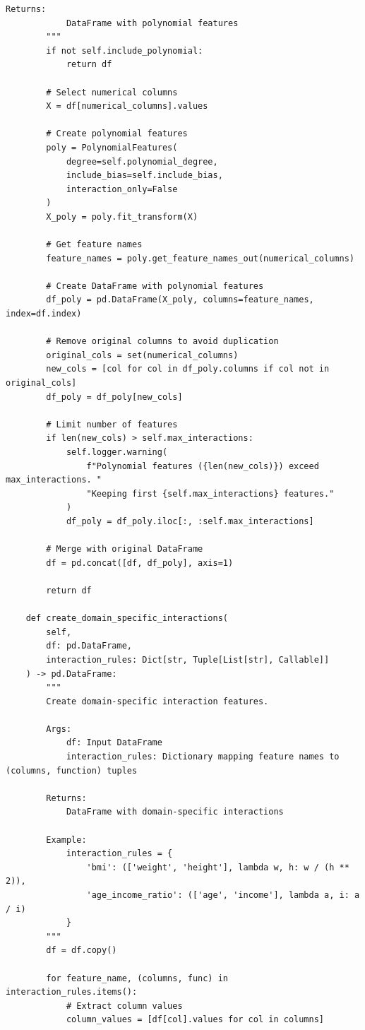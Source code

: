 \begin{lstlisting}[style=python, caption={Intelligent Feature Interaction Generation}]
        Returns:
            DataFrame with polynomial features
        """
        if not self.include_polynomial:
            return df

        # Select numerical columns
        X = df[numerical_columns].values

        # Create polynomial features
        poly = PolynomialFeatures(
            degree=self.polynomial_degree,
            include_bias=self.include_bias,
            interaction_only=False
        )
        X_poly = poly.fit_transform(X)

        # Get feature names
        feature_names = poly.get_feature_names_out(numerical_columns)

        # Create DataFrame with polynomial features
        df_poly = pd.DataFrame(X_poly, columns=feature_names, index=df.index)

        # Remove original columns to avoid duplication
        original_cols = set(numerical_columns)
        new_cols = [col for col in df_poly.columns if col not in original_cols]
        df_poly = df_poly[new_cols]

        # Limit number of features
        if len(new_cols) > self.max_interactions:
            self.logger.warning(
                f"Polynomial features ({len(new_cols)}) exceed max_interactions. "
                "Keeping first {self.max_interactions} features."
            )
            df_poly = df_poly.iloc[:, :self.max_interactions]

        # Merge with original DataFrame
        df = pd.concat([df, df_poly], axis=1)

        return df

    def create_domain_specific_interactions(
        self,
        df: pd.DataFrame,
        interaction_rules: Dict[str, Tuple[List[str], Callable]]
    ) -> pd.DataFrame:
        """
        Create domain-specific interaction features.

        Args:
            df: Input DataFrame
            interaction_rules: Dictionary mapping feature names to (columns, function) tuples

        Returns:
            DataFrame with domain-specific interactions

        Example:
            interaction_rules = {
                'bmi': (['weight', 'height'], lambda w, h: w / (h ** 2)),
                'age_income_ratio': (['age', 'income'], lambda a, i: a / i)
            }
        """
        df = df.copy()

        for feature_name, (columns, func) in interaction_rules.items():
            # Extract column values
            column_values = [df[col].values for col in columns]


\end{lstlisting}
